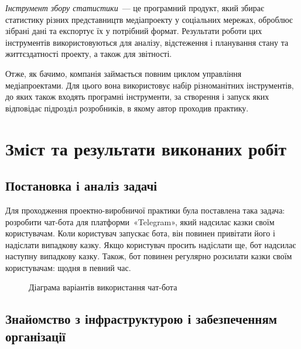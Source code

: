 \documentclass[
	a4paper,
	oneside,
	BCOR = 10mm,
	DIV = 12,
	12pt,
	headings = normal,
]{scrartcl}
\newlength{\gridunitwidth}
\begin{document}
		\emph{Інструмент збору статистики}~— це програмний продукт, який збирає статистику різних представництв медіапроекту у соціальних мережах, оброблює зібрані дані та експортує їх у потрібний формат. Результати роботи цих інструментів використовуються для аналізу, відстеження і планування стану та життєздатності проекту, а також для звітності.

		Отже, як бачимо, компанія займається повним циклом управління медіапроектами. Для цього вона використовує набір різноманітних інструментів, до яких також входять програмні інструменти, за створення і запуск яких відповідає підрозділ розробників, в якому автор проходив практику.

	\section{Зміст та результати виконаних робіт}
		\subsection{Постановка і аналіз задачі}
			Для проходження проектно-виробничої практики була поставлена така задача: розробити чат-бота для платформи~«\textenglish{Telegram}», який надсилає казки своїм користувачам. Коли користувач запускає бота, він повинен привітати його і надіслати випадкову казку. Якщо користувач просить надіслати ще, бот надсилає наступну випадкову казку. Також, бот повинен регулярно розсилати казки своїм користувачам: щодня в певний час.

			\begin{figure}[!htbp]
				\centering
				\caption{Діаграма варіантів використання чат-бота}
				\label{fig:bot-diag-use-case}
			\end{figure}

		\subsection{Знайомство з інфраструктурою і забезпеченням організації}
\end{document}
